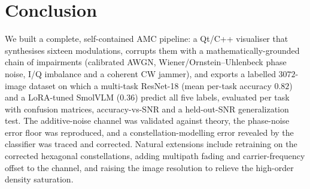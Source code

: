 \documentclass[11pt,a4paper,onecolumn,final]{article}
\newcommand{\gr}[1]{\foreignlanguage{greek}{#1}}
\newcommand{\en}[1]{\foreignlanguage{english}{#1}}
\begin{document}
\section{Conclusion}
We built a complete, self-contained AMC pipeline: a Qt/C++ visualiser that synthesises
sixteen modulations, corrupts them with a mathematically-grounded chain of impairments
(calibrated AWGN, Wiener/Ornstein--Uhlenbeck phase noise, I/Q imbalance and a coherent CW
jammer), and exports a labelled $3072$-image dataset on which a multi-task ResNet-18
(mean per-task accuracy $0.82$) and a LoRA-tuned SmolVLM ($0.36$) predict all five labels,
evaluated per task with confusion matrices, accuracy-vs-SNR and a held-out-SNR generalization
test. The additive-noise channel was validated against theory, the phase-noise error floor was
reproduced, and a constellation-modelling error revealed by the classifier was traced and
corrected. Natural extensions include retraining on
the corrected hexagonal constellations, adding multipath fading and carrier-frequency offset
to the channel, and raising the image resolution to relieve the high-order density
saturation.






\en{}
\end{document}
